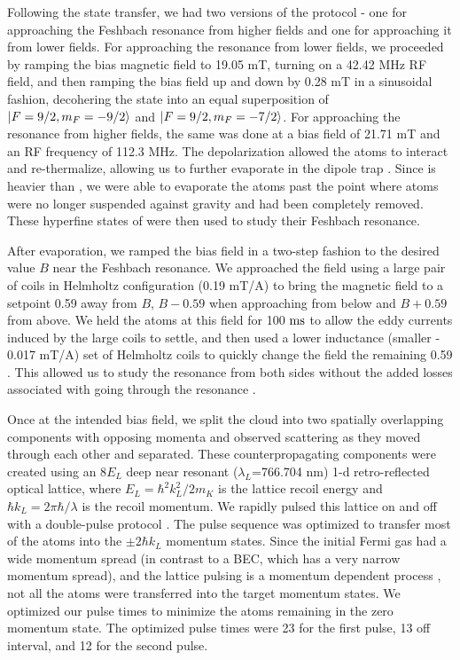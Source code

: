 \documentclass[12pt]{iopart}
\begin{document}
\par Following the state transfer, we had two versions of the protocol - one for approaching the Feshbach resonance from higher fields and one for approaching it from lower fields. For approaching the resonance from lower fields, we proceeded by ramping the bias magnetic field to 19.05 mT, turning on a 42.42 MHz RF field, and then ramping the bias field up and down by 0.28 mT in a sinusoidal fashion, decohering the \K{} state into an equal superposition of $\mathinner{|{F=9/2,m_F=-9/2}\rangle}$ and $\mathinner{|{F=9/2,m_F=-7/2}\rangle}$. For approaching the resonance from higher fields, the same was done at a bias field of 21.71 mT and an RF frequency of 112.3 MHz. The depolarization allowed the \K{} atoms to interact and re-thermalize, allowing us to further evaporate in the dipole trap \cite{DeMarco99}. Since \Rb{} is heavier than \K{}, we were able to evaporate the \K{} atoms past the point where \Rb{} atoms were no longer suspended against gravity and had been completely removed.  These hyperfine states of \K{} were then used to study their Feshbach resonance.
\par After evaporation, we ramped the bias field in a two-step fashion to the desired value $B$ near the Feshbach resonance. We approached the field using a large pair of  coils in Helmholtz configuration (0.19 mT/A) to bring the magnetic field to a setpoint 0.59 \mT{} away from $B$,  $B-0.59$ \mT{} when approaching from below and $B+0.59$  \mT{} from above. We held the atoms at this field for 100 $\rm{ms}$ to allow the eddy currents induced by the large coils to settle, and then used a lower inductance (smaller - 0.017 mT/A) set of Helmholtz coils to quickly change the field the remaining 0.59 \mT{}. This allowed us to study the resonance from both sides without the added losses associated with going through the resonance \cite{Chin10}.
\par Once at the intended bias field, we split the cloud into two spatially overlapping components with opposing momenta  and observed scattering as they moved through each other and separated. These counterpropagating components were created using an  8$E_L$ deep near resonant ($\lambda_L$=766.704 nm) 1-d retro-reflected optical lattice, where $E_L=\hbar^2 k_L^2/2m_K$ is the lattice recoil energy and $\hbar k_L=2\pi \hbar/ \lambda$ is the recoil momentum. We rapidly pulsed this lattice on and off with a double-pulse protocol \cite{Wu05, Edwards10}. The pulse sequence was optimized to transfer most of the atoms into the $\pm 2 \hbar k_L$ momentum states. Since the initial Fermi gas had a wide momentum spread (in contrast to a BEC, which has a very narrow momentum spread), and the lattice pulsing is a momentum dependent process  \cite{Wu05, Edwards10}, not all the atoms were transferred into the target momentum states. We optimized our pulse times to minimize the atoms remaining in the zero momentum state. The optimized pulse times were 23 \us{} for the first pulse, 13 \us{} off interval, and 12 \us{} for the second pulse.
\end{document}
